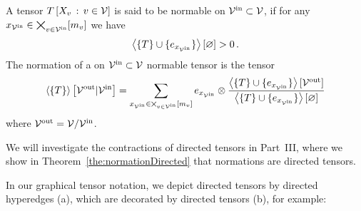 \begin{definition}\label{def:normation}
	A tensor $T\left[X_{v} \, : \, v \in \mathcal{V}\right]$ is said to be normable on $\mathcal{V}^{\mathrm{in}}\subset\mathcal{V}$, if for any $x_{\mathcal{V}^{\mathrm{in}}}\in\bigtimes_{v\in\mathcal{V}^{\mathrm{in}}}[m_{v}]$ we have
		\[ \left\langle \{T\} \cup\{e_{x_{\mathcal{V}^{\mathrm{in}}}}\}\right\rangle \left[ \varnothing \right] > 0 \, . \]
	The normation of a on $\mathcal{V}^{\mathrm{in}}\subset\mathcal{V}$ normable tensor is the tensor
	\begin{align*}
		\left\langle \{T\}\right\rangle \left[ \mathcal{V}^{\mathrm{out}} | \mathcal{V}^{\mathrm{in}} \right] = 
		\sum_{x_{\mathcal{V}^{\mathrm{in}}}\in\bigtimes_{v\in\mathcal{V}^{\mathrm{in}}}[m_{v}]} 
		e_{x_{\mathcal{V}^{\mathrm{in}}}} \otimes \frac{
		\left\langle \{T\}\cup\{e_{x_{\mathcal{V}^{\mathrm{in}}}}\}\right\rangle \left[ \mathcal{V}^{\mathrm{out}} \right]
		}{
		\left\langle \{T\}\cup\{e_{x_{\mathcal{V}^{\mathrm{in}}}}\}\right\rangle \left[ \varnothing \right]
		} 
	\end{align*}
	where $\mathcal{V}^{\mathrm{out}} = \mathcal{V} / \mathcal{V}^{\mathrm{in}}$.
%	
\end{definition}

We will investigate the contractions of directed tensors in Part~III, where we show in Theorem~\ref{the:normationDirected} that normations are directed tensors.


In our graphical tensor notation, we depict directed tensors by directed hyperedges (a), which are decorated by directed tensors (b), for example:
	\begin{center}
		
	\end{center}



